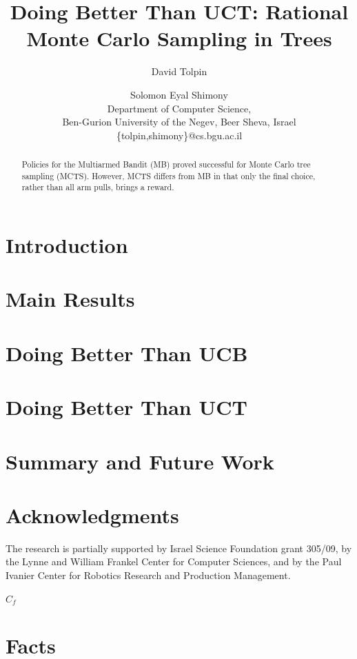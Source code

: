 \documentclass{article}
\title{Doing Better Than UCT: Rational Monte Carlo Sampling in Trees}
\author {David Tolpin \and Solomon Eyal Shimony \\
Department of Computer Science, \\
Ben-Gurion University of the Negev, Beer Sheva, Israel \\
\{tolpin,shimony\}@cs.bgu.ac.il}
\begin{document}
\maketitle

\begin{abstract}

Policies for the Multiarmed Bandit (MB) proved successful for Monte Carlo
tree sampling (MCTS). However, MCTS differs from MB in that only the
final choice, rather than all arm pulls, brings a reward. 

\end{abstract}


\section{Introduction}

\cite{Auer.ucb}

\section{Main Results}

\section{Doing Better Than UCB}

\section{Doing Better Than UCT}

\section{Summary and Future Work}

\section*{Acknowledgments}

The research is partially supported by Israel
Science Foundation grant 305/09, by the Lynne and William Frankel
Center for Computer Sciences, and by the Paul Ivanier Center for
Robotics Research and Production Management.

$\hat{C}_f$




\pagebreak

\appendix

\section{Facts}
\end{document}
